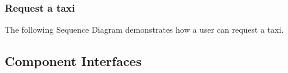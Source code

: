 \documentclass{article}
\begin{document}
	\subsubsection{Request a taxi}
	The following Sequence Diagram demonstrates how a user can request a taxi.
	\begin{figure}[H]
	\end{figure}
	\subsection{Component Interfaces}
\end{document}
